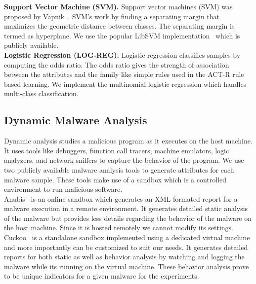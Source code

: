 \documentclass[conference]{IEEEtran}
\begin{document}
\noindent\textbf{Support Vector Machine (SVM).}  Support vector machines (SVM) was proposed by Vapnik~\cite{Cortes95support-vectornetworks}. SVM's work by finding a separating margin that maximizes the geometric distance between classes. The separating margin is termed as hyperplane. We use the popular LibSVM implementation~\cite{Chang2011} which is publicly available.\smallskip\\
\noindent\textbf{Logistic Regression (LOG-REG).}  Logistic regression classifies samples by computing the odds ratio. The odds ratio gives the strength of association between the attributes and the family like simple rules used in the ACT-R rule based learning. We implement the multinomial logistic regression which handles multi-class classification.

\subsection{Dynamic Malware Analysis}
\label{sandbox}
Dynamic analysis studies a malicious program as it executes on the host machine. It uses tools like debuggers, function call tracers, machine emulators, logic analyzers, and network sniffers to capture the behavior of the program. 
We use two publicly available malware analysis tools to generate attributes for each malware sample. These tools make use of a sandbox which is a controlled environment to run malicious software.\smallskip\\
  Anubis~\cite{anubis} is an online sandbox which generates an XML formated report for a malware execution in a remote environment. It generates detailed static analysis of the malware but provides less details regarding the behavior of the malware on the host machine. Since it is hosted remotely we cannot modify its settings.\smallskip\\
  Cuckoo~\cite{cuckoo} is a standalone sandbox implemented using a dedicated virtual machine and more importantly can be customized to suit our needs. It generates detailed reports for both static as well as behavior analysis by watching and logging the malware while its running on the virtual machine. These behavior analysis prove to be unique indicators for a given malware for the experiments. 
\end{document}
